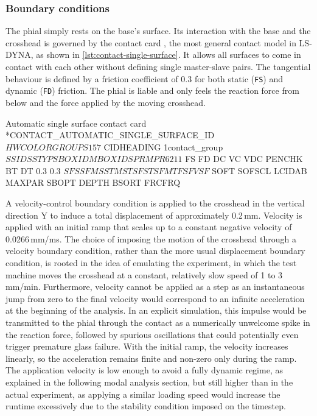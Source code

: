 \subsubsection{Boundary conditions}
The phial simply rests on the base's surface. Its interaction with the base and the crosshead is governed by the contact card , the most general contact model in LS-DYNA, as shown in \cref{lst:contact-single-surface}. It allows all surfaces to come in contact with each other without defining single master-slave pairs. The tangential behaviour is defined by a friction coefficient of 0.3 for both static (\texttt{FS}) and dynamic (\texttt{FD}) friction. The phial is liable and only feels the reaction force from below and the force applied by the moving crosshead.

\begin{dynacard}[label=lst:contact-single-surface]{Automatic single surface contact card}
*CONTACT_AUTOMATIC_SINGLE_SURFACE_ID
$HWCOLOR GROUPS       1      57
$      CIDHEADING
         1contact_group
$     SSID               SSTYP              SBOXID    MBOXID       SPR       MPR
         6                   2                                       1         1
$       FS        FD        DC        VC       VDC    PENCHK        BT        DT
       0.3       0.3
$      SFS       SFM       SST       MST      SFST      SFMT       FSF       VSF

$     SOFT    SOFSCL    LCIDAB    MAXPAR     SBOPT     DEPTH     BSORT    FRCFRQ
\end{dynacard}

A velocity-control boundary condition is applied to the crosshead in the vertical direction Y to induce a total displacement of approximately 0.2\,mm. Velocity is applied with an initial ramp that scales up to a constant negative velocity of 0.0266\,mm/ms. The choice of imposing the motion of the crosshead through a velocity boundary condition, rather than the more usual displacement boundary condition, is rooted in the idea of emulating the experiment, in which the test machine moves the crosshead at a constant, relatively slow speed of 1 to 3\,mm/min. Furthermore, velocity cannot be applied as a step as an instantaneous jump from zero to the final velocity would correspond to an infinite acceleration at the beginning of the analysis. In an explicit simulation, this impulse would be transmitted to the phial through the contact as a numerically unwelcome spike in the reaction force, followed by spurious oscillations that could potentially even trigger premature glass failure. With the initial ramp, the velocity increases linearly, so the acceleration remains finite and non-zero only during the ramp. The application velocity is low enough to avoid a fully dynamic regime, as explained in the following modal analysis section, but still higher than in the actual experiment, as applying a similar loading speed would increase the runtime excessively due to the stability condition imposed on the timestep.

